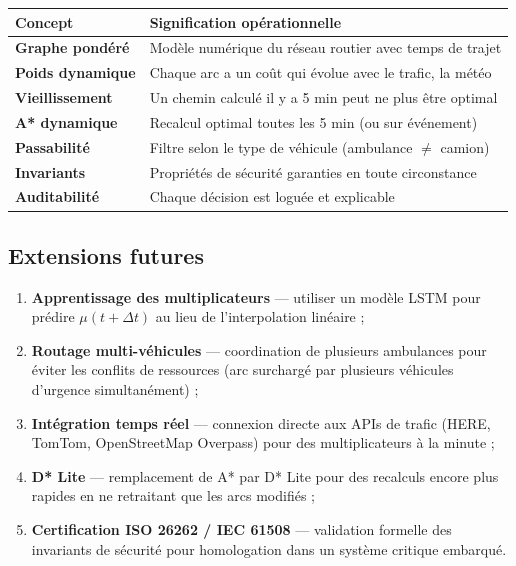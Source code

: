 \documentclass[12pt,a4paper]{article}
\theoremstyle{definition}
\theoremstyle{remark}
\begin{document}
\begin{center}
\begin{tabular}{>{\bfseries}p{3.5cm}p{9cm}}
  \toprule
  Concept & Signification opérationnelle \\
  \midrule
  Graphe pondéré & Modèle numérique du réseau routier avec temps de trajet \\
  Poids dynamique & Chaque arc a un coût qui évolue avec le trafic, la météo \\
  Vieillissement & Un chemin calculé il y a 5 min peut ne plus être optimal \\
  A* dynamique & Recalcul optimal toutes les 5 min (ou sur événement) \\
  Passabilité & Filtre selon le type de véhicule (ambulance $\neq$ camion) \\
  Invariants & Propriétés de sécurité garanties en toute circonstance \\
  Auditabilité & Chaque décision est loguée et explicable \\
  \bottomrule
\end{tabular}
\end{center}

\subsection{Extensions futures}

\begin{enumerate}
  \item \textbf{Apprentissage des multiplicateurs} — utiliser un modèle
        LSTM pour prédire $\mu(t+\Delta t)$ au lieu de l'interpolation
        linéaire ;
  \item \textbf{Routage multi-véhicules} — coordination de plusieurs
        ambulances pour éviter les conflits de ressources (arc surchargé
        par plusieurs véhicules d'urgence simultanément) ;
  \item \textbf{Intégration temps réel} — connexion directe aux APIs
        de trafic (HERE, TomTom, OpenStreetMap Overpass) pour des
        multiplicateurs à la minute ;
  \item \textbf{D* Lite} — remplacement de A* par D* Lite pour des
        recalculs encore plus rapides en ne retraitant que les arcs modifiés ;
  \item \textbf{Certification ISO 26262 / IEC 61508} — validation formelle
        des invariants de sécurité pour homologation dans un système
        critique embarqué.
\end{enumerate}
\end{document}
